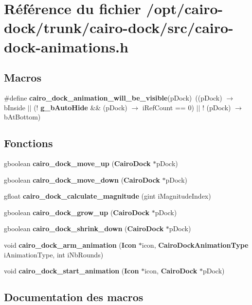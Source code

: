 \section{Référence du fichier /opt/cairo-dock/trunk/cairo-dock/src/cairo-dock-animations.h}
\label{cairo-dock-animations_8h}
\subsection*{Macros}
\begin{CompactItemize}
\item 
\#define {\bf cairo\_\-dock\_\-animation\_\-will\_\-be\_\-visible}(pDock)~((pDock) $\rightarrow$ bInside $|$$|$ (! {\bf g\_\-bAutoHide} \&\& (pDock) $\rightarrow$ iRefCount == 0) $|$$|$ ! (pDock) $\rightarrow$ bAtBottom)
\end{CompactItemize}
\subsection*{Fonctions}
\begin{CompactItemize}
\item 
gboolean {\bf cairo\_\-dock\_\-move\_\-up} ({\bf CairoDock} $\ast$pDock)
\item 
gboolean {\bf cairo\_\-dock\_\-move\_\-down} ({\bf CairoDock} $\ast$pDock)
\item 
gfloat {\bf cairo\_\-dock\_\-calculate\_\-magnitude} (gint iMagnitudeIndex)
\item 
gboolean {\bf cairo\_\-dock\_\-grow\_\-up} ({\bf CairoDock} $\ast$pDock)
\item 
gboolean {\bf cairo\_\-dock\_\-shrink\_\-down} ({\bf CairoDock} $\ast$pDock)
\item 
void {\bf cairo\_\-dock\_\-arm\_\-animation} ({\bf Icon} $\ast$icon, {\bf CairoDockAnimationType} iAnimationType, int iNbRounds)
\item 
void {\bf cairo\_\-dock\_\-start\_\-animation} ({\bf Icon} $\ast$icon, {\bf CairoDock} $\ast$pDock)
\end{CompactItemize}


\subsection{Documentation des macros}
